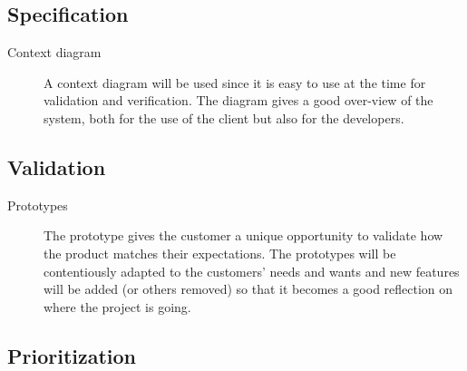 \documentclass[10pt,a4paper]{article}
\begin{document}
\subsection{Specification}

\begin{description}
\item[Context diagram] A context diagram will be used since it is easy to use at the time for validation and verification. The diagram gives a good over-view of the system, both for the use of the client but also for the developers. 
\end{description}

\subsection{Validation}
\begin{description}
\item[Prototypes] The prototype gives the customer a unique opportunity to validate how the product matches their expectations. The prototypes will be contentiously adapted to the customers' needs and wants and new features will be added (or others removed) so that it becomes a good reflection on where the project is going. 
\end{description}


\subsection{Prioritization}

\end{document}
